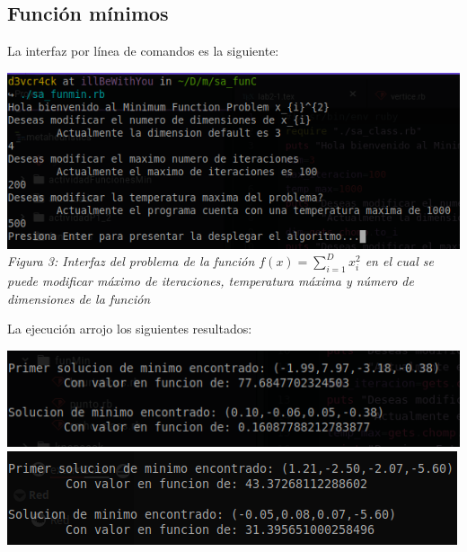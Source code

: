 \documentclass[10pt]{article}
\begin{document}
\subsection{Función mínimos}
La interfaz por línea de comandos es la siguiente:
\begin{center}
  \includegraphics[scale=0.5]{imgs/int-min.png}
  \\\textit{Figura 3: Interfaz del problema de la función \(\displaystyle f(x)=\sum_{i=1}^{D}x_{i}^{2}\) en el cual se puede modificar máximo de iteraciones, temperatura máxima y número de dimensiones de la función}
\end{center}
La ejecución arrojo los siguientes resultados:
\begin{center}
  \includegraphics[scale=0.5]{imgs/m_sol-1.png}\\
  \includegraphics[scale=0.5]{imgs/m_sol-2.png}
\end{center}
\end{document}
